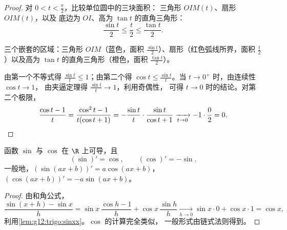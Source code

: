 \begin{proof}
对 $0 < t < \frac{\pi}{2}$，比较单位圆中的三块面积：
三角形 $OIM(t)$、扇形 $OIM(t)$，以及
底边为 $OI$、高为 $\tan t$ 的直角三角形：
\[
\frac{\sin t}{2} \leq \frac{t}{2} \leq \frac{\tan t}{2}.
\]

\begin{omfigure}

{\small 三个嵌套的区域：三角形 $OIM$（蓝色，面积
$\frac{\sin t}{2}$）、扇形（红色弧线所界，面积
$\frac{t}{2}$）以及高为 $\tan t$ 的直角三角形（橙色，面积
$\frac{\tan t}{2}$）。}
\end{omfigure}

由第一个不等式得 $\frac{\sin t}{t} \leq 1$；由第二个得
$\cos t \leq \frac{\sin t}{t}$。当 $t \to 0^+$ 时，由连续性 $\cos t \to 1$，
由夹逼定理得 $\frac{\sin t}{t} \to 1$，利用奇偶性，
可得 $t \to 0$ 时的结论。对第二个极限，
\[
\frac{\cos t - 1}{t} = \frac{\cos^2 t - 1}{t(\cos t + 1)}
= -\frac{\sin t}{t}\cdot\frac{\sin t}{\cos t + 1}
\xrightarrow[t\to0]{} -1 \cdot \frac{0}{2} = 0. \qedhere
\]
\end{proof}

\begin{theorem}[正弦与余弦的导数]\label{thm:g12:trigo:derivatives}
函数 $\sin$ 与 $\cos$ 在 $\R$ 上可导，且
\[
(\sin)' = \cos, \qquad (\cos)' = -\sin .
\]
一般地，$(\sin(ax+b))' = a\cos(ax+b)$，
$(\cos(ax+b))' = -a\sin(ax+b)$。
\end{theorem}

\begin{proof}
由和角公式，
\[
\frac{\sin(x+h) - \sin x}{h}
= \sin x\,\frac{\cos h - 1}{h} + \cos x\,\frac{\sin h}{h}
\xrightarrow[h\to0]{} \sin x \cdot 0 + \cos x \cdot 1 = \cos x,
\]
利用\cref{lem:g12:trigo:sinxx}。$\cos$ 的计算完全类似，
一般形式由链式法则得到。
\end{proof}

